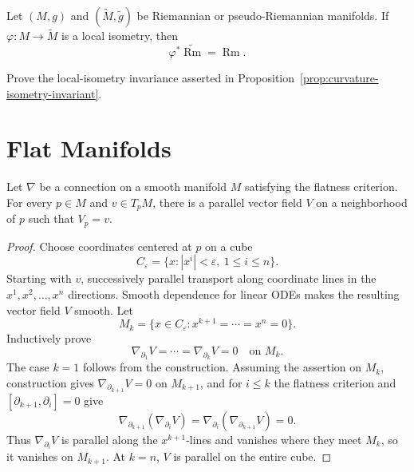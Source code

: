 \begin{proposition}
\label{prop:curvature-isometry-invariant}
Let $(M,g)$ and $(\widetilde M,\widetilde g)$ be Riemannian or
pseudo-Riemannian manifolds. If
$\varphi\colon M\to\widetilde M$ is a local isometry, then
\[
\varphi^*\widetilde{\operatorname{Rm}}=\operatorname{Rm}.
\]
\end{proposition}

\begin{exercise}
\label{exer:prove-curvature-isometry}
Prove the local-isometry invariance asserted in
Proposition~\ref{prop:curvature-isometry-invariant}.
\end{exercise}

\section{Flat Manifolds}

\begin{lemma}
\label{lem:parallel-vector-field-flatness}
Let $\nabla$ be a connection on a smooth manifold $M$ satisfying the flatness
criterion. For every $p\in M$ and $v\in T_pM$, there is a parallel vector field
$V$ on a neighborhood of $p$ such that $V_p=v$.
\end{lemma}

\begin{proof}
\sketch Choose coordinates centered at $p$ on a cube
\[
C_\varepsilon=\{x:|x^i|<\varepsilon,\ 1\leq i\leq n\}.
\]
Starting with $v$, successively parallel transport along coordinate lines in
the $x^1,x^2,\ldots,x^n$ directions. Smooth dependence for linear ODEs makes
the resulting vector field $V$ smooth. Let
\[
M_k=\{x\in C_\varepsilon:x^{k+1}=\cdots=x^n=0\}.
\]
Inductively prove
\begin{equation}
\nabla_{\partial_1}V=\cdots=\nabla_{\partial_k}V=0
\quad\text{on }M_k. \tag{7.9}
\end{equation}
The case $k=1$ follows from the construction. Assuming the assertion on
$M_k$, construction gives $\nabla_{\partial_{k+1}}V=0$ on $M_{k+1}$, and for
$i\leq k$ the flatness criterion and
$[\partial_{k+1},\partial_i]=0$ give
\[
\nabla_{\partial_{k+1}}(\nabla_{\partial_i}V)
=\nabla_{\partial_i}(\nabla_{\partial_{k+1}}V)=0.
\]
Thus $\nabla_{\partial_i}V$ is parallel along the $x^{k+1}$-lines and vanishes
where they meet $M_k$, so it vanishes on $M_{k+1}$. At $k=n$, $V$ is parallel
on the entire cube.
\end{proof}

